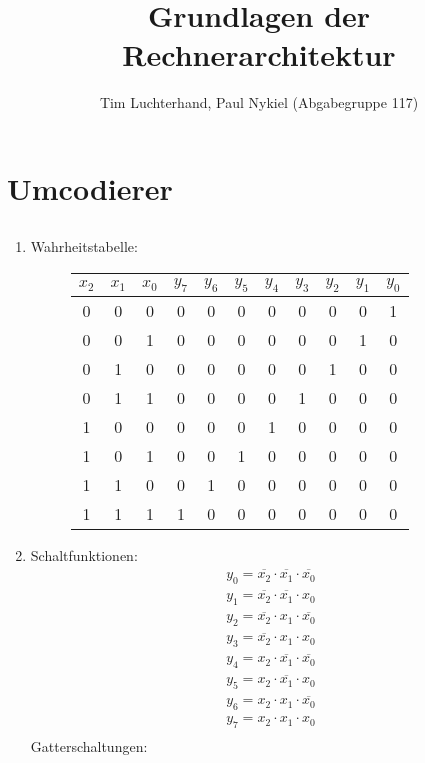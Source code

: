 \documentclass[DIN, pagenumber=false, fontsize=11pt, parskip=half]{scrartcl}
\title{Grundlagen der Rechnerarchitektur}
\author{Tim Luchterhand, Paul Nykiel (Abgabegruppe 117)}
\begin{document}
    \maketitle
    \section{Umcodierer}
    \subsection{}
    \begin{enumerate}[label=(\alph*)]
        \item
			Wahrheitstabelle:
            \begin{figure}[H]
                \centering
                \begin{tabular}{ccc|cccccccc}
                    \toprule
                    $x_2$ &$x_1$ & $x_0$ & $y_7$ & $y_6$ & $y_5$ & $y_4$ & $y_3$ & $y_2$ & $y_1$ & $y_0$ \\
                    \midrule
                    0 & 0 & 0  &  0 & 0 & 0 & 0 & 0 & 0 & 0 & 1\\
                    0 & 0 & 1  &  0 & 0 & 0 & 0 & 0 & 0 & 1 & 0\\
                    0 & 1 & 0  &  0 & 0 & 0 & 0 & 0 & 1 & 0 & 0\\
                    0 & 1 & 1  &  0 & 0 & 0 & 0 & 1 & 0 & 0 & 0\\
                    1 & 0 & 0  &  0 & 0 & 0 & 1 & 0 & 0 & 0 & 0\\
                    1 & 0 & 1  &  0 & 0 & 1 & 0 & 0 & 0 & 0 & 0\\
                    1 & 1 & 0  &  0 & 1 & 0 & 0 & 0 & 0 & 0 & 0\\
                    1 & 1 & 1  &  1 & 0 & 0 & 0 & 0 & 0 & 0 & 0\\
                    \bottomrule
                \end{tabular}
            \end{figure}
        \item
            Schaltfunktionen:
            \begin{eqnarray*}
                y_0 = \overline{x_2} \cdot \overline{x_1} \cdot \overline{x_0} \\
                y_1 = \overline{x_2} \cdot \overline{x_1} \cdot x_0 \\
                y_2 = \overline{x_2} \cdot x_1 \cdot \overline{x_0} \\
                y_3 = \overline{x_2} \cdot x_1 \cdot x_0 \\
                y_4 = x_2 \cdot \overline{x_1} \cdot \overline{x_0} \\
                y_5 = x_2 \cdot \overline{x_1} \cdot x_0 \\
                y_6 = x_2 \cdot x_1 \cdot \overline{x_0} \\
                y_7 = x_2 \cdot x_1 \cdot x_0 \\
            \end{eqnarray*}
            Gatterschaltungen:
    \end{enumerate}
\end{document}

